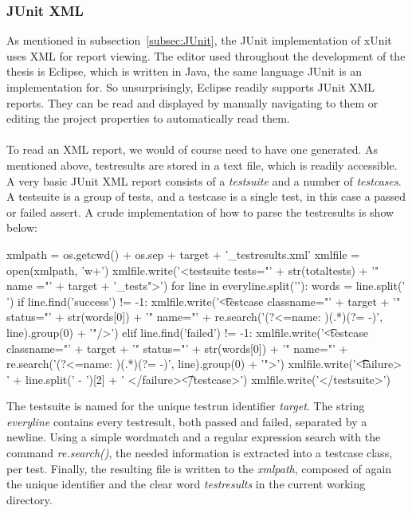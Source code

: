 \documentclass[11pt,british]{article}
\begin{document}
\subsubsection{JUnit XML}
As mentioned in subsection~\ref{subsec:JUnit}, the JUnit implementation of xUnit uses \gls{XML} for report viewing. The editor used throughout the development of the thesis is Eclipse, which is written in Java, the same language JUnit is an implementation for. So unsurprisingly, Eclipse readily supports JUnit XML reports. They can be read and displayed by manually navigating to them or editing the project properties to automatically read them.\\
\\
To read an XML report, we would of course need to have one generated. As mentioned above, testresults are stored in a text file, which is readily accessible. A very basic JUnit XML report consists of a \emph{testsuite} and a number of \emph{testcases}. A testsuite is a group of tests, and a testcase is a single test, in this case a passed or failed assert. A crude implementation of how to parse the testresults is show below:
\begin{python}
xmlpath = os.getcwd() + os.sep + target + '_testresults.xml'
xmlfile = open(xmlpath, 'w+')
xmlfile.write('<testsuite tests="' + str(totaltests) + '" name ="' 
			  + target + '_tests">')
for line in everyline.split('\n'):
  words = line.split(' ')
  if line.find('success') != -1:
    xmlfile.write('\n\t<testcase classname="' + target 
				  + '" status="' + str(words[0]) + '" name="' 
				  + re.search('(?<=name: )(.*)(?= -)', line).group(0)
				  + '"/>')
  elif line.find('failed') != -1:
	xmlfile.write('\n\t<testcase classname="' + target + '" status="' 
				  + str(words[0]) + '" name="' 
				  + re.search('(?<=name: )(.*)(?= -)', line).group(0)
				  + '">')
	xmlfile.write('\n\t\t<failure> ' + line.split(' - ')[2] 
				  + ' </failure>\n\t</testcase>')
xmlfile.write('\n</testsuite>')
\end{python}
The testsuite is named for the unique testrun identifier \emph{target}. The string \emph{everyline} contains every testresult, both passed and failed, separated by a newline. Using a simple wordmatch and a regular expression search with the command \emph{re.search()}, the needed information is extracted into a testcase class, per test. Finally, the resulting file is written to the \emph{xmlpath}, composed of again the unique identifier and the clear word \emph{testresults} in the current working directory.\\
\end{document}
